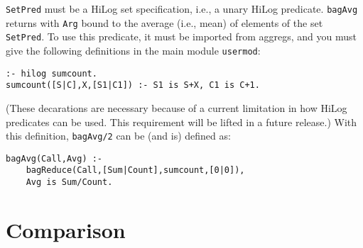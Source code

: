 \begin{description}
    {\tt SetPred} must be a HiLog set specification, i.e., a unary
    HiLog predicate.  {\tt bagAvg} returns with {\tt Arg} bound to the
    average (i.e., mean) of elements of the set {\tt SetPred}.  To use
    this predicate, it must be imported from aggregs, and you must give
    the following definitions in the main module {\tt usermod}:
\begin{verbatim}
:- hilog sumcount.
sumcount([S|C],X,[S1|C1]) :- S1 is S+X, C1 is C+1.
\end{verbatim}
    (These decarations are necessary because of a current limitation in
    how HiLog predicates can be used.  This requirement will be lifted in
    a future release.)  With this definition, {\tt bagAvg/2} can be (and
    is) defined as:
\begin{verbatim}
bagAvg(Call,Avg) :- 
    bagReduce(Call,[Sum|Count],sumcount,[0|0]),
    Avg is Sum/Count.
\end{verbatim}

\end{description}


\section{Comparison} \label{Comparison}



